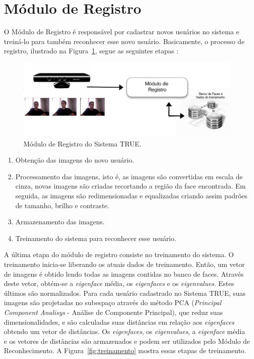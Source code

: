 \section{Módulo de Registro}

	O Módulo de Registro é responsável por cadastrar novos usuários no sistema e treiná-lo para também reconhecer esse novo usuário. Basicamente, o processo de registro, ilustrado na Figura~\ref{fig:registro}, segue as seguintes etapas :

		\begin{figure}[htb]
			\begin{center}
				\includegraphics[scale=1.5]{figuras/4.ProblemaEProposta/registro.png}
			\end{center}
			\caption{Módulo de Registro do Sistema TRUE.}
			\label{fig:registro}
		\end{figure}		

		\begin{enumerate}
			\item Obtenção das imagens do novo usuário.
			\item Processamento das imagens, isto é, as imagens são convertidas em escala de cinza, novas imagens são criadas recortando a região da face encontrada. Em seguida, as imagens são redimensionadas e equalizadas criando assim padrões de tamanho, brilho e contraste.
			\item Armazenamento das imagens.
			\item Treinamento do sistema para reconhecer esse usuário.
		\end{enumerate}

	A última etapa do módulo de registro consiste no treinamento do sistema. O treinamento inicia-se liberando os atuais dados de treinamento. Então, um vetor de imagens é obtido lendo todas as imagens contidas no banco de faces. Através deste vetor, obtém-se a \textit{eigenface} média, os \textit{eigenfaces} e os \textit{eigenvalues}. Estes últimos são normalizados. Para cada usuário cadastrado no Sistema TRUE, suas imagens são projetadas no subespaço através do método PCA (\textit{Principal Component Analisys} - Análise de Componente Principal), que reduz suas dimensionalidades, e são calculadas suas distâncias em relação aos \textit{eigenfaces} obtendo um vetor de distâncias. Os \textit{eigenfaces}, os \textit{eigenvalues}, a \textit{eigenface} média e os vetores de distâncias são armazenados e podem ser utilizados pelo Módulo de Reconhecimento. A Figura~\ref{fig:treinamento} mostra essas etapas de treinamento.

